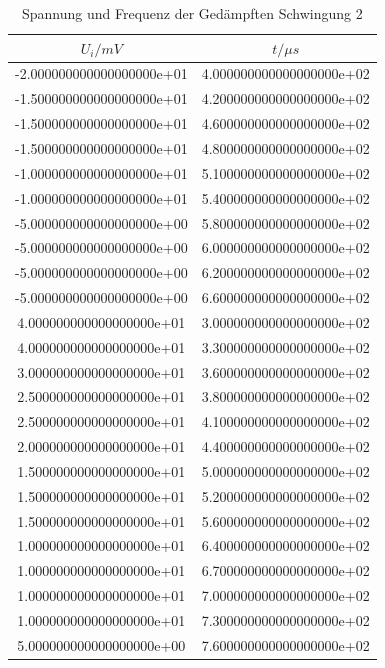 \begin{table}
\caption{Spannung und Frequenz der Gedämpften Schwingung 2}
\label{tab:5a2tab}
\begin{tabular}{S S}
  \toprule
  {$U_i/mV$} & {$t/\mu s$ }\\
  \midrule
  -2.000000000000000000e+01 & 4.000000000000000000e+02\\
  -1.500000000000000000e+01 & 4.200000000000000000e+02\\
  -1.500000000000000000e+01 & 4.600000000000000000e+02\\
  -1.500000000000000000e+01 & 4.800000000000000000e+02\\
  -1.000000000000000000e+01 & 5.100000000000000000e+02\\
  -1.000000000000000000e+01 & 5.400000000000000000e+02\\
  -5.000000000000000000e+00 & 5.800000000000000000e+02\\
  -5.000000000000000000e+00 & 6.000000000000000000e+02\\
  -5.000000000000000000e+00 & 6.200000000000000000e+02\\
  -5.000000000000000000e+00 & 6.600000000000000000e+02\\
    4.000000000000000000e+01 & 3.000000000000000000e+02\\
4.000000000000000000e+01 & 3.300000000000000000e+02\\
3.000000000000000000e+01 & 3.600000000000000000e+02\\
2.500000000000000000e+01 & 3.800000000000000000e+02\\
2.500000000000000000e+01 & 4.100000000000000000e+02\\
2.000000000000000000e+01 & 4.400000000000000000e+02\\
1.500000000000000000e+01 & 5.000000000000000000e+02\\
1.500000000000000000e+01 & 5.200000000000000000e+02\\
1.500000000000000000e+01 & 5.600000000000000000e+02\\
1.000000000000000000e+01 & 6.400000000000000000e+02\\
1.000000000000000000e+01 & 6.700000000000000000e+02\\
1.000000000000000000e+01 & 7.000000000000000000e+02\\
1.000000000000000000e+01 & 7.300000000000000000e+02\\
5.000000000000000000e+00 & 7.600000000000000000e+02\\

\end{tabular}
\end{table}
